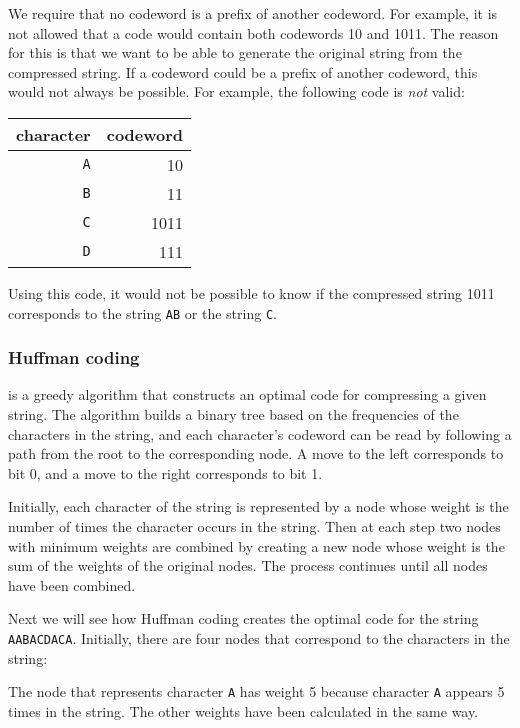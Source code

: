 We require that no codeword
is a prefix of another codeword.
For example, it is not allowed that a code
would contain both codewords 10
and 1011.
The reason for this is that we want
to be able to generate the original string
from the compressed string.
If a codeword could be a prefix of another codeword,
this would not always be possible.
For example, the following code is \emph{not} valid:
\begin{center}
\begin{tabular}{rr}
character & codeword \\
\hline
\texttt{A} & 10 \\
\texttt{B} & 11 \\
\texttt{C} & 1011 \\
\texttt{D} & 111 \\
\end{tabular}
\end{center}
Using this code, it would not be possible to know
if the compressed string 1011 corresponds to
the string \texttt{AB} or the string \texttt{C}.


\subsubsection{Huffman coding}

 \cite{huf52} is a greedy algorithm
that constructs an optimal code for
compressing a given string.
The algorithm builds a binary tree
based on the frequencies of the characters
in the string,
and each character's codeword can be read
by following a path from the root to
the corresponding node.
A move to the left corresponds to bit 0,
and a move to the right corresponds to bit 1.

Initially, each character of the string is
represented by a node whose weight is the
number of times the character occurs in the string.
Then at each step two nodes with minimum weights
are combined by creating
a new node whose weight is the sum of the weights
of the original nodes.
The process continues until all nodes have been combined.

Next we will see how Huffman coding creates
the optimal code for the string
\texttt{AABACDACA}.
Initially, there are four nodes that correspond
to the characters in the string:

\begin{center}
\end{center}
The node that represents character \texttt{A}
has weight 5 because character \texttt{A}
appears 5 times in the string.
The other weights have been calculated
in the same way.

